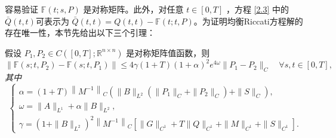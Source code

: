 \documentclass{GZUbachelorthesis}
\begin{document}
容易验证 $\mathbb{F}(t; s, P)$ 是对称矩阵。此外，对任意 $t \in [0, T]$ ，方程 \eqref{2.3} 中的$\bar{Q}(t, t)$可表示为 $\bar{Q}(t, t) = Q(t, t) - \mathbb{F}(t; t, P)$。为证明均衡Riccati方程解的存在唯一性，本节先给出以下三个引理：
\begin{lem}\cite{cai2022time}\label{引理 4.2.}
	假设 $P_1, P_2 \in C([0, T]; \mathbb{R}^{n\times n})$ 是对称矩阵值函数，则
	\begin{equation}\label{1.1}
		\|\mathbb{F}(s; t, P_2) - \mathbb{F}(s; t, P_1)\| \leq 4\gamma (1 + T)(1 + \alpha)^2 e^{4\omega} \|P_1 - P_2\|_C \quad \forall s, t \in [0, T],
	\end{equation}
	\textit{其中}
	\begin{equation}\label{1.2}
		\left\{
		\begin{array}{l}
			\alpha = (1 + T) \left\|M^{-1}\right\|_C \left( \|B\|_{L^2} (\|P_1\|_C + \|P_2\|_C) + \|S\|_C \right), \\
			\omega = \|A\|_{L^1} + \alpha \|B\|_{L^2}, \\
			\gamma = \left( 1 + \|B\|_{L^2} \right)^2 \left\|M^{-1}\right\|_C \left[ \|G\|_{C^1} + T\|Q\|_{C^1} + \|M\|_{C^1} + \|S\|_{C^1} \right].
		\end{array}
		\right.
	\end{equation}
\end{lem}
\vspace{1em}
\end{document}
